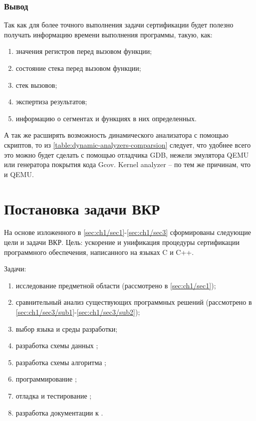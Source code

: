 \subsubsection{Вывод}\label{sec:ch1/sec3/sub2/sub4}
Так как для более точного выполнения задачи сертификации будет полезно получать
информацию времени выполнения программы, такую, как:
\begin{enumerate}[label={\arabic*)}]
    \item значения регистров перед вызовом функции;
    \item состояние стека перед вызовом функции;
    \item стек вызовов;
    \item экспертиза результатов;
    \item информацию о сегментах и функциях в них определенных.
\end{enumerate}
А так же расширять возможность динамического анализатора с помощью скриптов,
то из \autoref{table:dynamic-analyzers-comparsion} следует, что
удобнее всего это можно будет сделать с помощью отладчика GDB,
нежели эмулятора QEMU или генератора покрытия кода Gcov. Kernel analyzer --
по тем же причинам, что и QEMU.


\section{Постановка задачи ВКР}\label{sec:ch1/sec4}
На основе изложенного в \autoref{sec:ch1/sec1}-\autoref{sec:ch1/sec3} сформированы
следующие цели и задачи ВКР.
Цель: ускорение и унификация процедуры сертификации программного обеспечения, написанного
на языках C и C++.

Задачи:
\begin{enumerate}[label={\arabic*)}]
    \item исследование предметной области (рассмотрено в \autoref{sec:ch1/sec1});
    \item сравнительный анализ существующих программных решений 
        (рассмотрено в \autoref{sec:ch1/sec3/sub1}-\autoref{sec:ch1/sec3/sub2});
    \item выбор языка и среды разработки;
    \item разработка схемы данных {\ProgModule};
    \item разработка схемы алгоритма {\ProgModule};
    \item программирование {\ProgModule};
    \item отладка и тестирование {\ProgModule};
    \item разработка документации к {\ProgModule}.
\end{enumerate}

